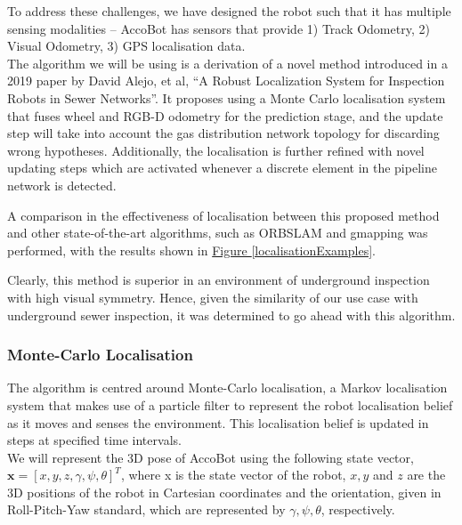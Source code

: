 \documentclass[11pt]{article}		%
\newcommand{\figref}[1]{\hyperref[#1]{Figure \ref*{#1}}}    %
\begin{document}
		To address these challenges, we have designed the robot such that it has multiple sensing modalities – AccoBot has sensors that provide 1) Track Odometry, 2) Visual Odometry, 3) GPS localisation data. 
        \\ \hspace*{3ex}The algorithm we will be using is a derivation of a novel method introduced in a 2019 paper by David Alejo, et al, “A Robust Localization System for Inspection Robots in Sewer Networks”. It proposes using a Monte Carlo localisation system that fuses wheel and RGB-D odometry for the prediction stage, and the update step will take into account the gas distribution network topology for discarding wrong hypotheses. Additionally, the localisation is further refined with novel updating steps which are activated whenever a discrete element in the pipeline network is detected.
                		
		\begin{floatingfigure}[r]{0pt} \end{floatingfigure}
        
        \hspace*{3ex}A comparison in the effectiveness of localisation between this proposed method and other state-of-the-art algorithms, such as ORBSLAM and gmapping was performed, with the results shown in \figref{localisationExamples}.

		Clearly, this method is superior in an environment of underground inspection with high visual symmetry. Hence, given the similarity of our use case with underground sewer inspection, it was determined to go ahead with this algorithm.
	
		\subsubsection{Monte-Carlo Localisation}
	    The algorithm is centred around Monte-Carlo localisation, a Markov localisation system that makes use of a particle filter to represent the robot localisation belief as it moves and senses the environment. This localisation belief is updated in steps at specified time intervals. 
	    \\ \hspace*{3ex}We will represent the 3D pose of AccoBot using the following state vector,     $\boldsymbol{x}=[x,  y,  z,  \gamma,  \psi,\theta]^{T}$, where x is the state vector
        of the robot, $x, y$ and $z$ are the 3D positions of the robot in Cartesian coordinates and the orientation,
        given in Roll-Pitch-Yaw standard, which are represented by $\gamma,  \psi,\theta$, respectively.
        
\end{document}
